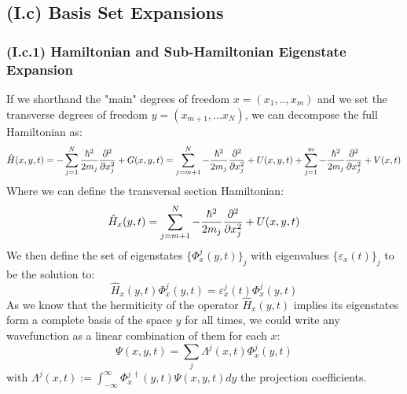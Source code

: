 \documentclass[11pt, a4paper]{article} %
\begin{document}
\subsection*{(I.c) Basis Set Expansions}
\subsubsection*{(I.c.1) Hamiltonian and Sub-Hamiltonian Eigenstate Expansion}

If we shorthand the "main" degrees of freedom $x=(x_1,..,x_m)$ and we set the transverse degrees of freedom $y=(x_{m+1},...x_N)$, we can decompose the full Hamiltonian as:
\begin{equation}
\hat{H}(x, y, t)= -\sum_{j=1}^N\frac{\hbar^2}{2m_j}\pdv[2]{}{x_j}+G(x, y, t)=\sum_{j=m+1}^{N}-\frac{\hbar^2}{2m_j}\pdv[2]{}{x_j}+U(x, y, t)+\sum_{j=1}^{m}-\frac{\hbar^2}{2m_j}\pdv[2]{}{x_j}+V(x,t)
\end{equation}
Where we can define the transversal section Hamiltonian:
\begin{equation}
\hat{H}_x(y,t)=\sum_{j=m+1}^{N}-\frac{\hbar^2}{2m_j}\pdv[2]{}{x_j}+U(x, y, t)
\end{equation} 
We then define the set of eigenstates $\{\Phi^j_x(y,t)\}_j$ with eigenvalues $\{\varepsilon_x(t)\}_j$ to be the solution to:
\begin{equation}
\hat{H}_x(y,t)\Phi^j_x(y,t)=\varepsilon^j_x(t)\Phi^j_x(y,t)
\end{equation}
As we know that the hermiticity of the operator $\hat{H}_x(y,t)$ implies its eigenstates form a complete basis of the space $y$ for all times, we could write any wavefunction as a linear combination of them for each $x$:
\begin{equation}
\Psi(x,y,t)=\sum_j \Lambda^j(x,t) \Phi^j_x(y,t)
\end{equation}
with $\Lambda^j(x,t):= \int_{-\infty}^{\infty}\Phi^{j\ \dagger}_x(y,t) \Psi(x,y,t)dy$ the projection coefficients.
\end{document}
